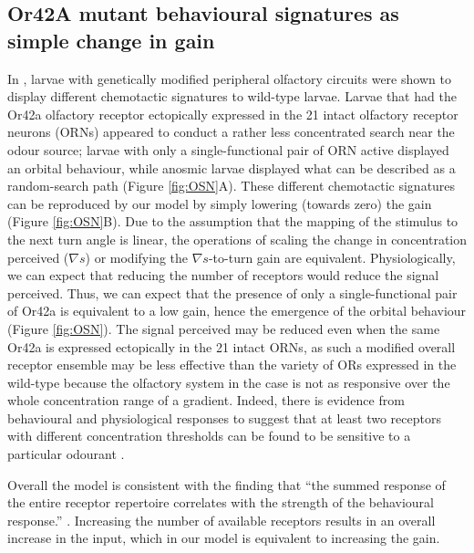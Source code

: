\documentclass[11pt,a4paper]{article}
\begin{document}
\subsection{Or42A mutant behavioural signatures as simple change in gain}
In \cite{gomez2011active}, larvae with genetically modified peripheral olfactory circuits were shown to display different chemotactic signatures to wild-type larvae.
 Larvae that had the Or42a olfactory receptor ectopically expressed in the 21 intact olfactory receptor neurons (ORNs) appeared to conduct a rather less concentrated search near the odour source; larvae with only a single-functional pair of ORN active displayed an orbital behaviour, while anosmic larvae displayed what can be described as a random-search path (Figure \ref{fig:OSN}A).
 These different chemotactic signatures can be reproduced by our model by simply lowering (towards zero) the gain 
 (Figure \ref{fig:OSN}B).
 Due to the assumption that the mapping of the stimulus to the next turn angle is linear, the operations of scaling the change in concentration perceived ($\nabla s$) or modifying the $\nabla s$-to-turn gain are equivalent. Physiologically, we can expect that reducing the number of receptors would reduce the signal perceived. Thus, we can expect that the presence of only a single-functional pair of Or42a is equivalent to a low gain, hence the emergence of the orbital behaviour (Figure \ref{fig:OSN}).
 The signal perceived may be reduced even when the same Or42a is expressed ectopically in the 21 intact ORNs, as such a modified overall receptor ensemble may be less effective than the variety of ORs expressed in the wild-type because the olfactory system in the case is not as responsive over the whole concentration range of a gradient. Indeed, there is evidence from behavioural and physiological responses to suggest that at least two receptors with different concentration thresholds can be found to be sensitive to a particular odourant \citep{kreher2008translation}. 

Overall the model is consistent with the finding that ``the summed response of the entire receptor repertoire correlates with the strength of the behavioural response.” \citep{kreher2008translation}. Increasing the number of available receptors results in an overall increase in the input, which in our model is equivalent to increasing the gain.
\end{document}
